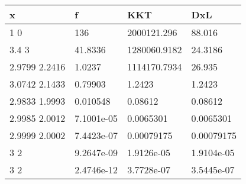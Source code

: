 \begin{tabular}{llll}
x & f & KKT & DxL \\ 
\hline 
1  0 & 136 & 2000121.296 & 88.016 \\ 
3.4           3 & 41.8336 & 1280060.9182 & 24.3186 \\ 
2.9799      2.2416 & 1.0237 & 1114170.7934 & 26.935 \\ 
3.0742      2.1433 & 0.79903 & 1.2423 & 1.2423 \\ 
2.9833      1.9993 & 0.010548 & 0.08612 & 0.08612 \\ 
2.9985      2.0012 & 7.1001e-05 & 0.0065301 & 0.0065301 \\ 
2.9999      2.0002 & 7.4423e-07 & 0.00079175 & 0.00079175 \\ 
3           2 & 9.2647e-09 & 1.9126e-05 & 1.9104e-05 \\ 
3           2 & 2.4746e-12 & 3.7728e-07 & 3.5445e-07 \\ 
\hline 
\end{tabular}